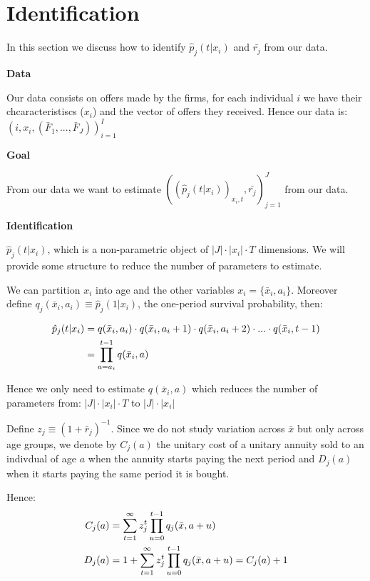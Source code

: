 \documentclass[12pt]{article}
\theoremstyle{plain}
\theoremstyle{plain}
\begin{document}
\section{Identification}


In this section we discuss how to identify $\hat{p}_{j}(t|x_{i})$  and  $\bar{r_{j}}$ from our data. 


\textbf{Data}

Our data consists on offers made by the firms, for each individual $i$ we have their chcaracteristiscs ($x_i$) and the vector of offers they received. Hence our data is:  $(i, x_i, (\bar{F}_1, ..., \bar{F}_J))_{i=1}^I$ 

\textbf{Goal}

From our data we want to estimate 
$((\hat{p}_{j}(t|x_{i}))_{x_i,t},  \bar{r_{j}})_{j=1}^J$ from our data.

\textbf{Identification}


$\hat{p}_{j}(t|x_{i})$, which is a non-parametric object of $|J|\cdot |x_{i}|\cdot T$ dimensions. We will provide some structure to reduce the number of parameters to estimate.  

We can partition $x_{i}$ into age and the other variables $x_{i}=\{\bar{x}_i, a_i\}$. Moreover define $q_{j}(\bar{x}_i, a_i) \equiv \hat{p}_{j}(1|x_i) $, the one-period survival probability, then: 

\begin{align}\label{eq:mort_form}
    \hat{p}_{j}(t|x_i) &= q(\bar{x}_i, a_i)\cdot q(\bar{x}_i, a_i+1) \cdot q(\bar{x}_i, a_i+2) \cdot ... \cdot q(\bar{x}_i, t-1) \notag \\
    &= \prod_{a= a_i}^{t-1}q(\bar{x}_i, a)
\end{align}

Hence we only need to estimate $q(\bar{x}_i, a)$
which reduces the number of parameters from: $|J|\cdot |x_{i}|\cdot T$  to $|J|\cdot |x_{i}|$ 

Define $z_j \equiv (1+\bar{r}_j)^{-1}$. Since we do not study variation across $\bar{x}$ but only across age groups, we denote by $C_j(a)$ the unitary cost of a unitary annuity sold to an indivdual of age $a$ when the annuity starts paying the next period and $D_j(a)$ when it starts paying the same period it is bought. 

Hence: 
\begin{align}\label{eq:ident_costs}
    C_j(a) &= \sum_{t=1}^{\infty} z_j^t \prod_{u=0}^{t-1} q_j(\bar{x}, a+u)  \notag \\  
    D_j(a) &= 1 + \sum_{t=1}^{\infty} z_j^t \prod_{u=0}^{t-1} q_j(\bar{x}, a+u)  = C_j(a) + 1  
\end{align}
\end{document}
